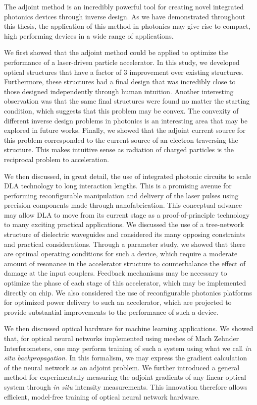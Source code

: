 
The adjoint method is an incredibly powerful tool for creating novel integrated photonics devices through inverse design.
As we have demonstrated throughout this thesis, the application of this method in photonics may give rise to compact, high performing devices in a wide range of applications.

We first showed that the adjoint method could be applied to optimize the performance of a laser-driven particle accelerator.
In this study, we developed optical structures that have a factor of 3 improvement over existing structures.
Furthermore, these structures had a final design that was incredibly close to those designed independently through human intuition.
Another interesting observation was that the same final structures were found no matter the starting condition, which suggests that this problem may be convex.
The convexity of different inverse design problems in photonics is an interesting area that may be explored in future works.
Finally, we showed that the adjoint current source for this problem corresponded to the current source of an electron traversing the structure.
This makes intuitive sense as radiation of charged particles is the reciprocal problem to acceleration.

We then discussed, in great detail, the use of integrated photonic circuits to scale DLA technology to long interaction lengths.
This is a promising avenue for performing reconfigurable manipulation and delivery of the laser pulses using precision components made through nanofabrication.
This conceptual advance may allow DLA to move from its current stage as a proof-of-principle technology to many exciting practical applications.
We discussed the use of a tree-network structure of dielectric waveguides and considered its many opposing constraints and practical considerations.
Through a parameter study, we showed that there are optimal operating conditions for such a device, which require a moderate amount of resonance in the accelerator structure to counterbalance the effect of damage at the input couplers.
Feedback mechanisms may be necessary to optimize the phase of each stage of this accelerator, which may be implemented directly on chip.
We also considered the use of reconfigurable photonics platforms for optimized power delivery to such an accelerator, which are projected to provide substantial improvements to the performance of such a device.

We then discussed optical hardware for machine learning applications.
We showed that, for optical neural networks implemented using meshes of Mach Zehnder Interferometers, one may perform training of such a system using what we call \textit{in situ backpropagation}.  In this formalism, we may express the gradient calculation of the neural network as an adjoint problem.
We further introduced a general method for experimentally measuring the adjoint gradients of any linear optical system through \textit{in situ} intensity measurements.
This innovation therefore allows efficient, model-free training of optical neural network hardware.

